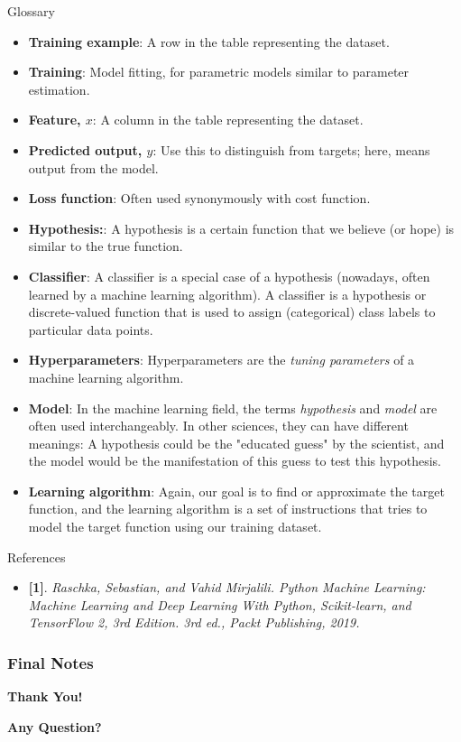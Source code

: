 \documentclass[compress,oilve]{beamer}
\begin{document}
\begin{frame}{Glossary}
\begin{itemize}
\item \textbf{Training example}: A row in the table representing the dataset.
\item \textbf{Training}: Model fitting, for parametric models similar to parameter estimation.
\item \textbf{Feature, $x$}: A column in the table representing the dataset.
\item \textbf{Predicted output, $\hat{y}$}: Use this to distinguish from targets; here, means output from the model.
\item \textbf{Loss function}: Often used synonymously with cost function.
\item \textbf{Hypothesis:}: A hypothesis is a certain function that we believe (or hope) is similar to the true function.
\item \textbf{Classifier}: A classifier is a special case of a hypothesis (nowadays, often learned by a machine learning algorithm). A classifier is a hypothesis or discrete-valued function that is used to assign (categorical) class labels to particular data points. 
\item \textbf{Hyperparameters}: Hyperparameters are the \textit{tuning parameters} of a machine learning algorithm.
\item \textbf{Model}: In the machine learning field, the terms \textit{hypothesis} and \textit{model} are often used interchangeably. In other sciences, they can have different meanings: A hypothesis could be the "educated guess" by the scientist, and the model would be the manifestation of this guess to test this hypothesis.
\item \textbf{Learning algorithm}: Again, our goal is to find or approximate the target function, and the learning algorithm is a set of instructions that tries to model the target function using our training dataset.
\end{itemize}
\end{frame}


\begin{frame}{References}
\begin{itemize}
\item{} \textbf{[1]}. \textit{Raschka, Sebastian, and Vahid Mirjalili. Python Machine Learning: Machine Learning and Deep Learning With Python, Scikit-learn, and TensorFlow 2, 3rd Edition. 3rd ed., Packt Publishing, 2019.}
\end{itemize}
\end{frame}




\frametitle{Final Notes}
\centering
\vspace{50 pt}
\textbf{Thank You!}
\vspace{50pt}

\textbf{Any Question?}
\end{document}
